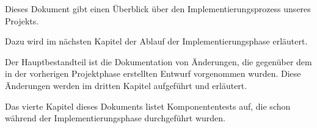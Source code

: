 Dieses Dokument gibt einen Überblick über den Implementierungsprozess unseres Projekts.

Dazu wird im nächsten Kapitel der Ablauf der Implementierungsphase erläutert.

Der Hauptbestandteil ist die Dokumentation von Änderungen, die gegenüber dem in der vorherigen Projektphase erstellten Entwurf vorgenommen wurden. Diese Änderungen werden im dritten Kapitel aufgeführt und erläutert.

Das vierte Kapitel dieses Dokuments listet Komponententests auf, die schon während der Implementierungsphase durchgeführt wurden.